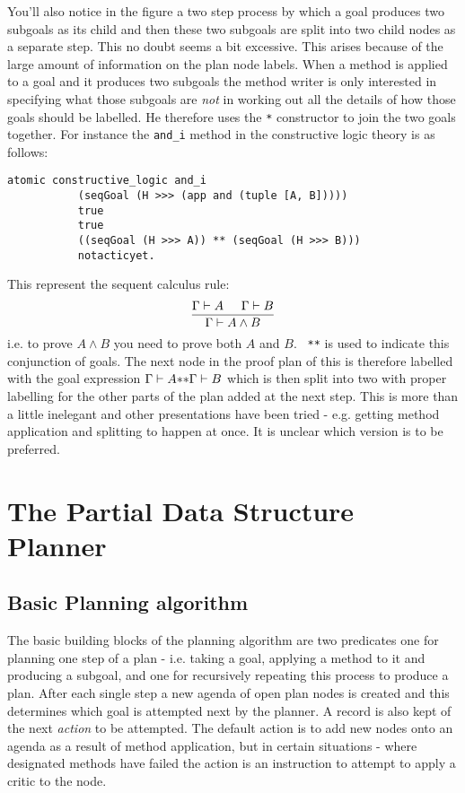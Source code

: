 You'll also notice in the figure a two step process by which a goal
produces two subgoals as its child and then these two subgoals are
split into two child nodes as a separate step.  This no doubt seems a
bit excessive.  This arises because of the large amount of information
on the plan node labels.  When a method is applied to a goal and it
produces two subgoals the method writer is only interested in
specifying what those subgoals are {\em not} in working out all the
details of how those goals should be labelled.  He therefore uses the
{\tt **}\index{**} constructor to join the two goals together.  For
instance the {\tt and\_i} method in the constructive
logic theory is as follows:
\begin{verbatim}
atomic constructive_logic and_i 
           (seqGoal (H >>> (app and (tuple [A, B])))) 
           true 
           true
           ((seqGoal (H >>> A)) ** (seqGoal (H >>> B))) 
           notacticyet.
\end{verbatim}
This represent the sequent calculus rule:
\begin{equation}
\frac{\Gamma \vdash A \hspace{0.5cm} \Gamma \vdash B}{\Gamma \vdash A
  \wedge B}
\end{equation}
i.e. to prove $A \wedge B$ you need to prove both $A$ and $B$.  {\tt
  **} is used to indicate this conjunction of goals.  The next node in
the proof plan of this is therefore labelled with the goal expression
$\Gamma \vdash A {\tt **} \Gamma \vdash B$ which is then split into
two with proper labelling for the other parts of the plan added at the
next step.  This is more than a little inelegant and other
presentations have been tried - e.g. getting method application and
splitting to happen at once.  It is unclear which version is to be
preferred.

\section{The Partial Data Structure Planner} 

\subsection{Basic Planning algorithm}
The basic building blocks of the planning algorithm are two predicates 
one for planning one step of a plan - i.e. taking a goal, applying a
method to it and producing a subgoal, and one for recursively
repeating this process to produce a plan.  After each single step a
new agenda of open plan nodes is created and this
determines which goal is attempted next by the planner.  A record is
also kept of the next {\em action} to be attempted.  The 
default action is to add new nodes onto an agenda as a result of
method application, but in certain situations - where designated
methods have failed the action is an instruction to attempt to apply a 
critic to the node.

